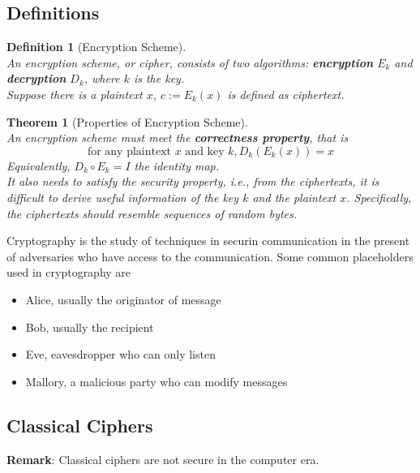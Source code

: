 \documentclass[12pt]{article}
\newtheorem{definition}{Definition}[section]
\newtheorem{theorem}{Theorem}[section]
\theoremstyle{definition}
\begin{document}
\subsection{Definitions}
\begin{definition}[Encryption Scheme]
\hfill\\\normalfont An encryption scheme, or cipher, consists of two algorithms: \textbf{encryption} $E_k$ and \textbf{decryption} $D_k$, where $k$ is the key. \\
Suppose there is a plaintext $x$, $c:=E_k(x)$ is defined as ciphertext.
\end{definition}
\begin{theorem}[Properties of Encryption Scheme]
\hfill\\\normalfont An encryption scheme must meet the \textbf{correctness property}, that is
\[
\text{for any plaintext }x\text{ and key }k, D_k(E_k(x))=x
\]
Equivalently, $D_k\circ E_k=I$ the identity map.\\
It also needs to satisfy the security property, i.e., from the ciphertexts, it is difficult to derive useful information of the key $k$ and the plaintext $x$. Specifically, the ciphertexts should resemble sequences of random bytes.
\end{theorem}
Cryptography is the study of techniques in securin communication in the present of adversaries who have access to the communication. Some common placeholders used in cryptography are
\begin{itemize}
  \item Alice, usually the originator of message
  \item Bob, usually the recipient
  \item Eve, eavesdropper who can only listen
  \item Mallory, a malicious party who can modify messages
\end{itemize}
\subsection{Classical Ciphers}
\textbf{Remark}: Classical ciphers are not secure in the computer era.
\end{document}

